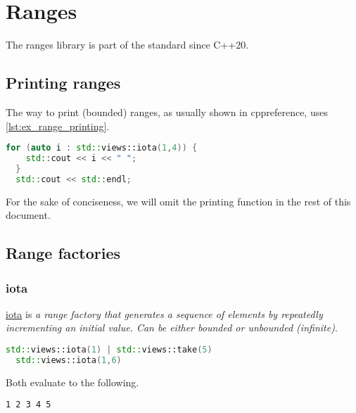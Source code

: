 \section{Ranges}
The ranges library \cite{cppreference_ranges} is part of the standard since
C++20.

\subsection{Printing ranges}
The way to print (bounded) ranges, as usually shown in cppreference, uses
\cref{lst:ex_range_printing}.

\begin{lstlisting}[language=C++, caption={Range printing example},
                   label={lst:ex_range_printing}]
  for (auto i : std::views::iota(1,4)) {
    std::cout << i << " ";
  }
  std::cout << std::endl;
\end{lstlisting}

For the sake of conciseness, we will omit the printing function in the rest of
this document.

\subsection{Range factories}
\subsubsection{iota}
\href{https://en.cppreference.com/w/cpp/ranges/iota_view}{iota} is
\emph{a range factory that generates a sequence of elements by repeatedly
  incrementing an initial value. Can be either bounded or unbounded (infinite)}.

\begin{lstlisting}[language=C++, caption={iota example}, label={lst:ex_iota}]
  std::views::iota(1) | std::views::take(5)
  std::views::iota(1,6) \end{lstlisting}

Both evaluate to the following.

\begin{lstlisting}[language={}]
  1 2 3 4 5 \end{lstlisting}
